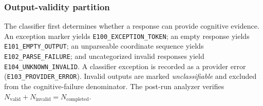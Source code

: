 \documentclass{article}
\begin{document}
\subsubsection{Output-validity partition}
The classifier first determines whether a response can provide cognitive
evidence. An exception marker yields \texttt{E100\_EXCEPTION\_TOKEN}; an empty
response yields \texttt{E101\_EMPTY\_OUTPUT}; an unparseable coordinate
sequence yields \texttt{E102\_PARSE\_FAILURE}; and uncategorized invalid
responses yield \texttt{E104\_UNKNOWN\_INVALID}. A classifier exception is
recorded as a provider error (\texttt{E103\_PROVIDER\_ERROR}). Invalid outputs
are marked \emph{unclassifiable} and excluded from the cognitive-failure
denominator. The post-run analyzer verifies
$N_{\mathrm{valid}}+N_{\mathrm{invalid}}=N_{\mathrm{completed}}$.
\end{document}
